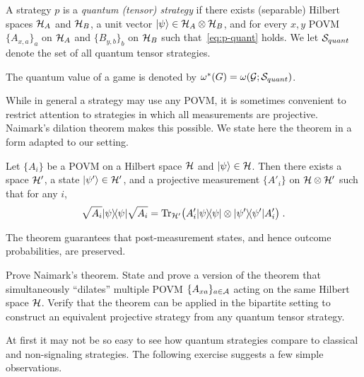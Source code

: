 \begin{definition}
A strategy $p$ is a \emph{quantum (tensor) strategy} if there exists (separable) Hilbert spaces $\mathcal{H}_A$ and $\mathcal{H}_B$, a unit vector $|\psi\rangle\in \mathcal{H}_A\otimes \mathcal{H}_B$, and for every $x,y$ POVM $\{A_{x,a}\}_a$ on $\mathcal{H}_A$ and $\{B_{y,b}\}_b$ on $\mathcal{H}_B$ such that~\eqref{eq:p-quant} holds. We let $\mathcal{S}_{quant}$ denote the set of all quantum tensor strategies.

The quantum value of a game is denoted by $\omega^*(G) = \omega(\mathcal{G};\mathcal{S}_{quant})$. 
\end{definition}

While in general a strategy may use any POVM, it is sometimes convenient to restrict attention to strategies in which all measurements are projective. Naimark's dilation theorem makes this possible. We state here the theorem in a form adapted to our setting. 

\begin{theorem}[Naimark]
Let $\{A_i\}$ be a POVM on a Hilbert space $\mathcal{H}$ and $|\psi\rangle\in\mathcal{H}$. Then there exists a space $\mathcal{H}'$, a state $|\psi'\rangle\in \mathcal{H}'$, and a projective measurement $\{A'_i\}$ on $\mathcal{H}\otimes \mathcal{H}'$ such that for any $i$, 
\[\sqrt{A_i}|\psi\rangle\!\langle\psi|\sqrt{A_i} = \mbox{\rm Tr}_{\mathcal{H}'}\big( A'_i |\psi\rangle\!\langle\psi|\otimes|\psi'\rangle\!\langle\psi'| A'_i\big)\;.\]
\end{theorem}

The theorem guarantees that post-measurement states, and hence outcome probabilities, are preserved. 

\begin{exercise}
Prove Naimark's theorem. State and prove a version of the theorem that simultaneously ``dilates'' multiple POVM $\{A_{xa}\}_{a\in\mathcal{A}}$ acting on the same Hilbert space $\mathcal{H}$. Verify that the theorem can be applied in the bipartite setting to construct an equivalent projective strategy from any quantum tensor strategy. 
\end{exercise}





At first it may not be so easy to see how quantum strategies compare to classical and non-signaling strategies. The following exercise suggests a few simple observations. 

